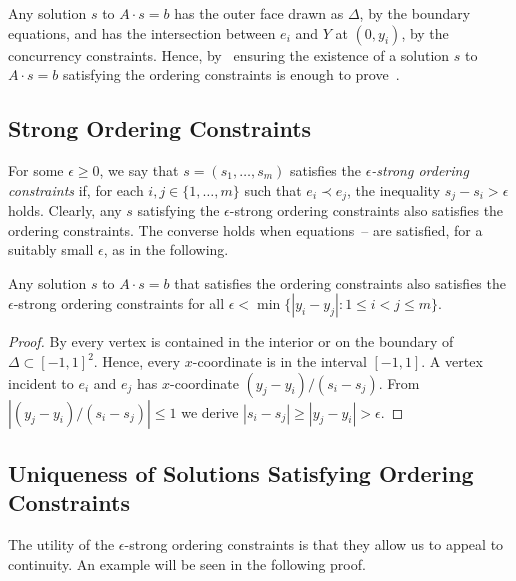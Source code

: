 Any solution $s$ to $A\cdot s=b$ has the outer face drawn as $\Delta$, by the boundary equations, and has the intersection between $e_i$ and $Y$ at $(0,y_i)$, by the concurrency constraints. Hence, by~ ensuring the existence of a solution $s$ to $A\cdot s=b$ satisfying the ordering constraints is enough to prove~.

\subsection{Strong Ordering Constraints}
\label{strong}

For some $\epsilon \ge 0$, we say that $s=(s_1,\ldots,s_m)$ satisfies
the \emph{$\epsilon$-strong ordering constraints} if, for each
$i,j\in\{1,\ldots,m\}$ such that $e_i\prec e_j$, the inequality
$s_j-s_i > \epsilon$ holds.
Clearly, any $s$ satisfying the $\epsilon$-strong ordering constraints also satisfies the ordering constraints. The converse holds when equations~\thetag{\ref{eq:slope0}}--\thetag{\ref{eq:proportion2}} are satisfied, for a suitably small $\epsilon$, as in the following.

\begin{lem}
	Any solution $s$ to $A\cdot s=b$ that satisfies
	the ordering constraints
	also satisfies 
	the $\epsilon$-strong ordering constraints
	for all $\epsilon<\min\{|y_i-y_j| : 1\le i< j\le m\}$.
\end{lem}

\begin{proof}
	By  every vertex is contained in the interior or on the boundary of $\Delta\subset[-1,1]^2$.
	Hence, every $x$-coordinate is
	in the interval $[-1,1]$.
	A vertex incident to $e_i$ and $e_j$ has $x$-coordinate
	$(y_j-y_i)/(s_i-s_j)$.
	From $|(y_j-y_i)/(s_i-s_j)|\le 1$ we derive
	$|s_i-s_j|\ge|y_j-y_i| > \epsilon$.
\end{proof}

\subsection{Uniqueness of Solutions Satisfying Ordering Constraints}

The utility of the $\epsilon$-strong ordering constraints is that they
allow us to appeal to continuity. 
An example will be seen in the following proof.

